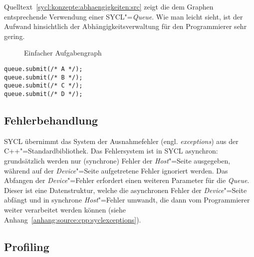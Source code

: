Quelltext~\ref{sycl:konzepte:abhaengigkeiten:src} zeigt die dem Graphen
entsprechende Verwendung einer SYCL"=\textit{Queue}. Wie man leicht sieht, ist
der Aufwand hinsichtlich der Abhängigkeitsverwaltung für den Programmierer sehr
gering.

\begin{figure}
    \centering
    \caption{Einfacher Aufgabengraph}
    \label{sycl:konzepte:abhaengigkeiten:graph}
\end{figure}

\begin{code}
    \begin{verbatim}
queue.submit(/* A */);
queue.submit(/* B */);
queue.submit(/* C */);
queue.submit(/* D */);
    \end{verbatim}
    \caption{Einfacher SYCL-Aufgabengraph}
    \label{sycl:konzepte:abhaengigkeiten:src}
\end{code}

\subsection{Fehlerbehandlung}

SYCL übernimmt das System der Ausnahmefehler (engl. \textit{exceptions}) aus
der C++"=Standardbibliothek. Das Fehlersystem ist in SYCL asynchron:
grundsätzlich werden nur (synchrone) Fehler der \textit{Host}"=Seite ausgegeben,
während auf der \textit{Device}"=Seite aufgetretene Fehler ignoriert werden. Das
Abfangen der \textit{Device}"=Fehler erfordert einen weiteren Parameter für die
\textit{Queue}. Dieser ist eine Datenstruktur, welche die asynchronen Fehler der
\textit{Device}"=Seite abfängt und in synchrone \textit{Host}"=Fehler umwandt,
die dann vom Programmierer weiter verarbeitet werden können
(siehe Anhang~\ref{anhang:source:cpp:syclexceptions}).

\subsection{Profiling}

